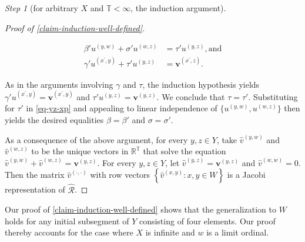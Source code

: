 \documentclass[ecta,nameyear,draft]{econsocart}
\newcommand{\R}{\mathbb R}
\newcommand{\hext}{\mathrel{\hat{\mathrel{\mathcal R}}}}
\newcommand{\mbbt}{{\mathds {T}}}
\newcommand{\xy}{{(x, y)}}
\newcommand{\yz}{{(y,z)}}
\newcommand{\yw}{{(y,w)}}
\newcommand{\wz}{(w,z)}
\newcommand{\xpy}{(x^{\prime},y)}
\newcommand{\xpz}{(x^{\prime},z)}
\newcommand{\dd}{{(\cdot,\cdot)}}
\renewcommand{\v}{{\mathbf{v}}}
\theoremstyle{plain}
\theoremstyle{remark}
\newtheorem{step}{Step}[section]
\begin{document}
\begin{appendix}
\begin{step}[for arbitrary $X$ and $\mbbt < \infty$, the induction
    argument]
\begin{proofEnd}
\begin{proof}[Proof of \cref{claim-induction-well-defined}]
\begin{linenomath*}
\begin{align}
      \label{eq-yz-xp}
      \beta' u^{\yw} + \sigma' u^{\wz}& = \tau' u^{\yz}, \text{and}\\
      \label{eq-xpz-y}
      \gamma' u^{\xpy} + \tau' u^{\yz} &= \v^{\xpz}.
   \end{align}
  \end{linenomath*}
  \addtocounter{linenumber}{-1} As in the arguments involving $\gamma$ and
  $\tau$, the induction hypothesis yields
  $\gamma ' u^{\xpy} = \v^{\xpy}$ and $\tau ' u^{\yz} = \v^{\yz}$.
  We conclude that $\tau = \tau'$.  Substituting for $\tau'$ in \cref{eq-yz-xp}
  and appealing to linear independence of $\{u^{\yw}, u^{\wz}\}$ then yields the
  desired equalities $\beta = \beta'$ and $\sigma = \sigma '$.
    
    As a consequence of the above argument, for every $y , z \in Y$, take
    $\hat{v}^{\yw}$ and $\hat{v}^{\wz}$ to be the unique vectors in $\R^{\mbbt}$
    that solve the equation $\hat{v}^{\yw} + \hat{v}^{\wz} = \v^{\yz}$.
    For every $y , z \in Y$, let $\hat{v}^{\yz} = \v^{\yz}$ and $\hat{v}^{(w,w)}
    = 0$.  Then the matrix $\hat{v}^{\dd}$ with row vectors $\left\{
      \hat{v}^{\xy}: x , y \in W \right\}$ is a Jacobi representation of $\hext$.
  \end{proof}
  Our proof of \cref{claim-induction-well-defined} shows that the
  {generalization} to $W$ holds for any initial subsegment of $Y$ consisting of
  four elements. Our proof thereby accounts for the case where $X$ is infinite
  and $w$ is a limit ordinal.
  \end{proofEnd}
  \end{step}
  

\end{appendix}
\end{document}
